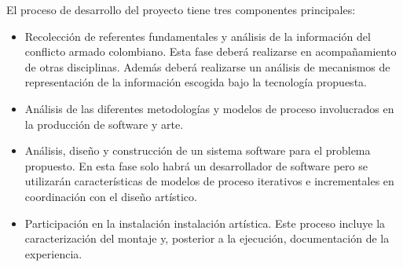 El proceso de desarrollo del proyecto tiene tres componentes principales:
\begin{itemize}
    \item Recolección de referentes fundamentales y análisis de la información del conflicto armado colombiano. Esta fase deberá realizarse en acompañamiento de otras disciplinas. Además deberá realizarse un análisis de mecanismos de representación de la información escogida bajo la tecnología propuesta.
    \item Análisis de las diferentes metodologías y modelos de proceso involucrados en la producción de software y arte.
    \item Análisis, diseño y construcción de un sistema software para el problema propuesto. En esta fase solo habrá un desarrollador de software pero se utilizarán características de modelos de proceso iterativos e incrementales en coordinación con el diseño artístico.
    \item Participación en la instalación instalación artística. Este proceso incluye la caracterización del montaje y, posterior a la ejecución, documentación de la experiencia.
\end{itemize}

